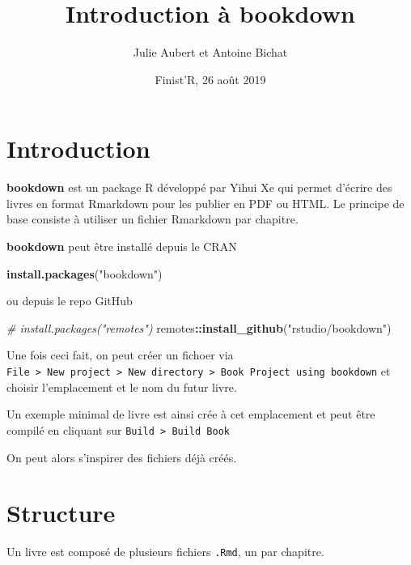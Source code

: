 \documentclass[]{book}
\title{Introduction à bookdown}
\author{Julie Aubert et Antoine Bichat}
\date{Finist'R, 26 août 2019}
\newenvironment{Shaded}{\begin{snugshade}}{\end{snugshade}}
\newcommand{\CommentTok}[1]{\textcolor[rgb]{0.56,0.35,0.01}{\textit{#1}}}
\newcommand{\KeywordTok}[1]{\textcolor[rgb]{0.13,0.29,0.53}{\textbf{#1}}}
\newcommand{\NormalTok}[1]{#1}
\newcommand{\OperatorTok}[1]{\textcolor[rgb]{0.81,0.36,0.00}{\textbf{#1}}}
\newcommand{\StringTok}[1]{\textcolor[rgb]{0.31,0.60,0.02}{#1}}
\theoremstyle{definition}
\theoremstyle{definition}
\theoremstyle{definition}
\theoremstyle{remark}
\begin{document}
\maketitle

{
\setcounter{tocdepth}{1}
\tableofcontents
}
\hypertarget{intro}{%
\chapter{Introduction}\label{intro}}

\textbf{bookdown} est un package R développé par Yihui Xe qui permet d'écrire des livres en format Rmarkdown pour les publier en PDF ou HTML. Le principe de base consiste à utiliser un fichier Rmarkdown par chapitre.

\textbf{bookdown} peut être installé depuis le CRAN

\begin{Shaded}
\begin{Highlighting}[]
\KeywordTok{install.packages}\NormalTok{(}\StringTok{"bookdown"}\NormalTok{)}
\end{Highlighting}
\end{Shaded}

ou depuis le repo GitHub

\begin{Shaded}
\begin{Highlighting}[]
\CommentTok{# install.packages("remotes")}
\NormalTok{remotes}\OperatorTok{::}\KeywordTok{install_github}\NormalTok{(}\StringTok{"rstudio/bookdown"}\NormalTok{)}
\end{Highlighting}
\end{Shaded}

Une fois ceci fait, on peut créer un fichoer via \texttt{File\ \textgreater{}\ New\ project\ \textgreater{}\ New\ directory\ \textgreater{}\ Book\ Project\ using\ bookdown} et choisir l'emplacement et le nom du futur livre.

Un exemple minimal de livre est ainsi crée à cet emplacement et peut être compilé en cliquant sur \texttt{Build\ \textgreater{}\ Build\ Book}

On peut alors s'inspirer des fichiers déjà créés.

\hypertarget{structure}{%
\chapter{Structure}\label{structure}}

Un livre est composé de plusieurs fichiers \texttt{.Rmd}, un par chapitre.
\end{document}
